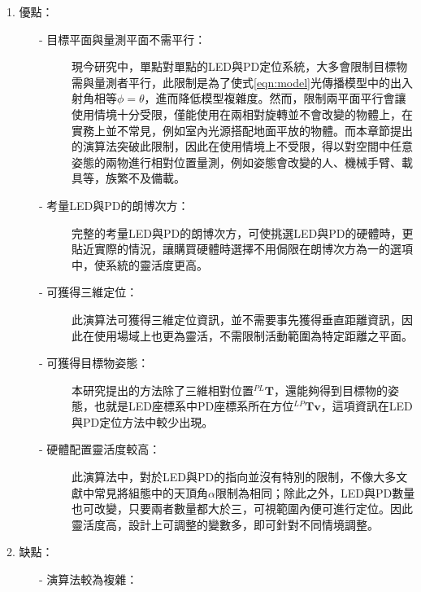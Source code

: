 \begin{description}
    \item[1. 優點：]\hfill
    
    \begin{description}
        \item[- 目標平面與量測平面不需平行：]\hfill
        
        \qquad
        現今研究中，單點對單點的LED與PD定位系統，大多會限制目標物需與量測者平行，此限制是為了使式\ref{eqn:model}光傳播模型中的出入射角相等$\phi=\theta$，進而降低模型複雜度。然而，限制兩平面平行會讓使用情境十分受限，僅能使用在兩相對旋轉並不會改變的物體上，在實務上並不常見，例如室內光源搭配地面平放的物體。而本章節提出的演算法突破此限制，因此在使用情境上不受限，得以對空間中任意姿態的兩物進行相對位置量測，例如姿態會改變的人、機械手臂、載具等，族繁不及備載。
    
        \item[- 考量LED與PD的朗博次方：]\hfill
        
        \qquad
        完整的考量LED與PD的朗博次方，可使挑選LED與PD的硬體時，更貼近實際的情況，讓購買硬體時選擇不用侷限在朗博次方為一的選項中，使系統的靈活度更高。

        \item[- 可獲得三維定位：] \hfill
        
        \qquad
        此演算法可獲得三維定位資訊，並不需要事先獲得垂直距離資訊，因此在使用場域上也更為靈活，不需限制活動範圍為特定距離之平面。

        \item[- 可獲得目標物姿態：] \hfill
        
        \qquad
        本研究提出的方法除了三維相對位置$^{PL}\boldsymbol{T}$，還能夠得到目標物的姿態，也就是LED座標系中PD座標系所在方位$^{LP}\boldsymbol{Tv}$，這項資訊在LED與PD定位方法中較少出現。
        
        \item[- 硬體配置靈活度較高：] \hfill
        
        \qquad
        此演算法中，對於LED與PD的指向並沒有特別的限制，不像大多文獻中常見將組態中的天頂角$\alpha$限制為相同；除此之外，LED與PD數量也可改變，只要兩者數量都大於三，可視範圍內便可進行定位。因此靈活度高，設計上可調整的變數多，即可針對不同情境調整。
    
    \end{description}

    \item[2. 缺點：] \hfill
    
    \begin{description}
        \item[- 演算法較為複雜：]  \hfill
        

\end{description}
\end{description}
